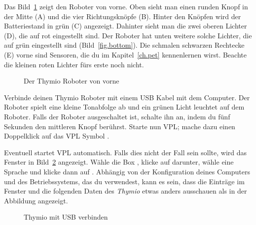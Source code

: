 

Das Bild~\ref{fig.front} zeigt den Roboter von vorne. Oben sieht man einen runden Knopf in
der Mitte (A) und die vier Richtungsknöpfe (B). Hinter den Knöpfen wird der
Batteriestand in grün (C) angezeigt. Dahinter sieht man die zwei oberen Lichter (D), die auf
rot eingestellt sind. Der Roboter hat unten weitere solche Lichter, die auf
grün eingestellt sind (Bild~\ref{fig.bottom}). Die schmalen schwarzen Rechtecke (E) vorne
sind Sensoren, die du im Kapitel~\ref{ch.pet} kennenlernen wirst. Beachte die kleinen roten Lichter fürs erste noch nicht.

\begin{figure}[h]
\begin{center}
\caption{Der Thymio Roboter von vorne}\label{fig.front}
\end{center}
\end{figure}

\pagebreak


Verbinde deinen Thymio Roboter mit einem USB Kabel mit dem Computer. Der
Roboter spielt eine kleine Tonabfolge ab und  ein grünen Licht leuchtet auf dem
Roboter. Falls der Roboter ausgeschaltet ist, schalte ihn an, indem du fünf
Sekunden den mittleren Knopf berührst. Starte nun VPL; mache dazu einen
Doppelklick auf das VPL Symbol . 


Eventuell startet VPL automatisch. Falls dies nicht der Fall sein sollte, wird das
Fenster in Bild~\ref{fig.connect} angezeigt. Wähle die Box
, klicke auf  darunter, wähle eine
Sprache und klicke dann auf .
Abhängig von der
Konfiguration deines Computers und des Betriebssystems, das du verwendest, kann es
sein, dass die Einträge im Fenster und die folgenden Daten des \emph{Thymio} etwas anders ausschauen als in der Abbildung angezeigt.


\begin{figure}
\begin{center}
\caption{Thymio mit USB verbinden}\label{fig.connect}
\end{center}
\end{figure} 

